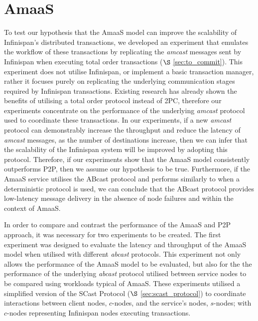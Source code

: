 \section{AmaaS}\label{sec:emulated_transactions}
	To test our hypothesis that the \textsf{AmaaS} model can improve the scalability of Infinispan's distributed transactions, we developed an experiment that emulates the workflow of these transactions by replicating the \emph{amcast} messages sent by Infinispan when executing total order transactions ($\S$ \ref{sec:to_commit}).  This experiment does not utilise Infinispan, or implement a basic transaction manager, rather it focuses purely on replicating the underlying communication stages required by Infinispan transactions.  Existing research \citep{Ruivo:2011:ETO:2120967.2121604} has already shown the benefits of utilising a total order protocol instead of 2PC, therefore our experiments concentrate on the performance of the underlying \emph{amcast} protocol used to coordinate these transactions.  In our experiments, if a new \emph{amcast} protocol can demonstrably increase the throughput and reduce the latency of \emph{amcast} messages, as the number of destinations increase,  then we can infer that the scalability of the Infinispan system will be improved by adopting this protocol.  Therefore, if our experiments show that the \textsf{AmaaS} model consistently outperforms P2P, then we assume our hypothesis to be true. Furthermore, if the \textsf{AmaaS} service utilises the \textsf{ABcast} protocol and performs similarly to when a deterministic protocol is used, we can conclude that the \textsf{ABcast} protocol provides low-latency message delivery in the absence of node failures and within the context of \textsf{AmaaS}.  
	
   In order to compare and contrast the performance of the \textsf{AmaaS} and P2P approach, it was necessary for two experiments to be created.  The first experiment was designed to evaluate the latency and throughput of the \textsf{AmaaS} model when utilised with different \emph{abcast} protocols.  This experiment not only allows the performance of the \textsf{AmaaS} model to be evaluated, but also for the the performance of the underlying \emph{abcast} protocol utilised between service nodes to be compared using workloads typical of \textsf{AmaaS}.  These experiments utilised a simplified version of the \textsf{SCast} Protocol ($\S$ \ref{sec:scast_protocol}) to coordinate interactions between client nodes, $c$-nodes, and the service's nodes, $s$-nodes; with $c$-nodes representing Infinispan nodes executing transactions.  
   

